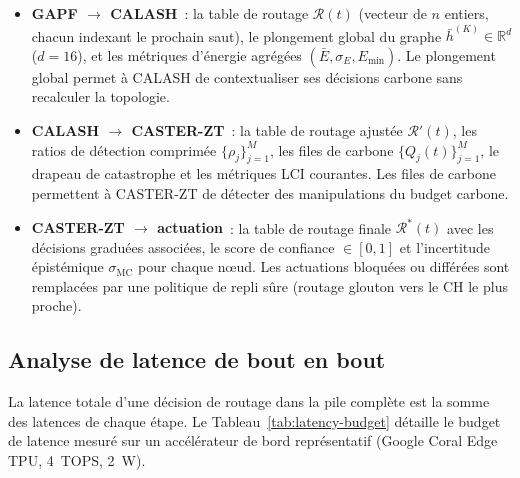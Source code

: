 \begin{itemize}
    \item \textbf{GAPF $\to$ CALASH}~: la table de routage $\mathcal{R}(t)$ (vecteur de $n$ entiers, chacun indexant le prochain saut), le plongement global du graphe $\bar{h}^{(K)} \in \mathbb{R}^d$ ($d = 16$), et les métriques d'énergie agrégées $(\bar{E}, \sigma_E, E_{\min})$. Le plongement global permet à CALASH de contextualiser ses décisions carbone sans recalculer la topologie.
    \item \textbf{CALASH $\to$ CASTER-ZT}~: la table de routage ajustée $\mathcal{R}'(t)$, les ratios de détection comprimée $\{\rho_j\}_{j=1}^{M}$, les files de carbone $\{Q_j(t)\}_{j=1}^{M}$, le drapeau de catastrophe et les métriques LCI courantes. Les files de carbone permettent à CASTER-ZT de détecter des manipulations du budget carbone.
    \item \textbf{CASTER-ZT $\to$ actuation}~: la table de routage finale $\mathcal{R}^*(t)$ avec les décisions graduées associées, le score de confiance $\in [0, 1]$ et l'incertitude épistémique $\sigma_{\text{MC}}$ pour chaque n\oe{}ud. Les actuations bloquées ou différées sont remplacées par une politique de repli sûre (routage glouton vers le CH le plus proche).
\end{itemize}

\subsection{Analyse de latence de bout en bout}

La latence totale d'une décision de routage dans la pile complète est la somme des latences de chaque étape. Le Tableau~\ref{tab:latency-budget} détaille le budget de latence mesuré sur un accélérateur de bord représentatif (Google Coral Edge TPU, 4~TOPS, 2~W).

